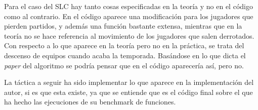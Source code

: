 Para el caso del SLC hay tanto cosas especificadas en la teoría y no en el código como al contrario. En el código aparece una modificación para los jugadores que pierden partidos, y además una función bastante extensa, mientras que en la teoría no se hace referencia al movimiento de los jugadores que salen derrotados. Con respecto a lo que aparece en la teoría pero no en la práctica, se trata del descenso de equipos cuando acaba la temporada. Basándose en lo que dicta el \textit{paper} del algoritmo se podría pensar que en el código aparecería así, pero no.

La táctica a seguir ha sido implementar lo que aparece en la implementación del autor, si es que esta existe, ya que se entiende que es el código final sobre el que ha hecho las ejecuciones de su benchmark de funciones.